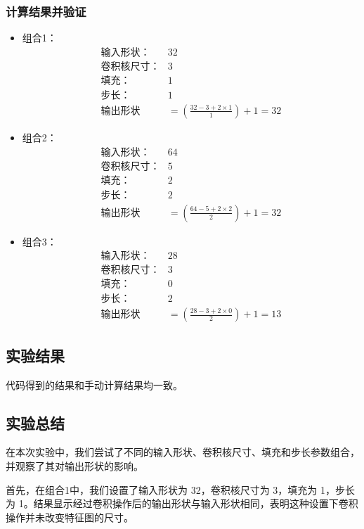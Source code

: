 \documentclass[a4paper,12pt]{article}
\begin{document}
\subsubsection{计算结果并验证}
\begin{itemize}
  \item 组合1：
\begin{align*}
\text{输入形状：} & 32 \\
\text{卷积核尺寸：} & 3 \\
\text{填充：} & 1 \\
\text{步长：} & 1 \\
\text{输出形状} & = \left( \frac{32 - 3 + 2 \times 1}{1} \right) + 1 = 32
\end{align*}

  \item 组合2：
\begin{align*}
\text{输入形状：} & 64 \\
\text{卷积核尺寸：} & 5 \\
\text{填充：} & 2 \\
\text{步长：} & 2 \\
\text{输出形状} & = \left( \frac{64 - 5 + 2 \times 2}{2} \right) + 1 = 32
\end{align*}
  \item 组合3：
\begin{align*}
\text{输入形状：} & 28 \\
\text{卷积核尺寸：} & 3 \\
\text{填充：} & 0 \\
\text{步长：} & 2 \\
\text{输出形状} & = \left( \frac{28 - 3 + 2 \times 0}{2} \right) + 1 = 13
\end{align*}

\end{itemize}
\subsection{实验结果}
代码得到的结果和手动计算结果均一致。

\subsection{实验总结}
在本次实验中，我们尝试了不同的输入形状、卷积核尺寸、填充和步长参数组合，并观察了其对输出形状的影响。

首先，在组合1中，我们设置了输入形状为 32，卷积核尺寸为 3，填充为 1，步长为 1。结果显示经过卷积操作后的输出形状与输入形状相同，表明这种设置下卷积操作并未改变特征图的尺寸。
\end{document}
